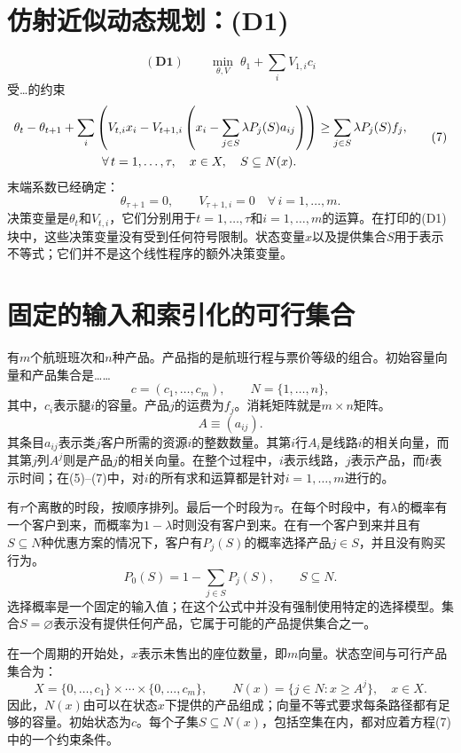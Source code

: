 \documentclass{article}
\begin{document}
\section*{仿射近似动态规划：(D1)}

\begin{equation}
(\mathbf{D1})\qquad
\min_{\theta,V}\;\theta_1+\sum_i V_{1,i}c_i
\tag{6}
\end{equation}
受…的约束
\begin{equation}
\begin{aligned}
&\theta_t-\theta_{t+1}
 +\sum_i\left(V_{t,i}x_i-V_{t+1,i}\left(x_i-\sum_{j\in S}\lambda P_j(S)a_{ij}\right)\right)
 \geq \sum_{j\in S}\lambda P_j(S)f_j,\\
&\hspace{25mm}\forall\,t=1,\ldots,\tau,\quad x\in X,\quad S\subseteq N(x).
\end{aligned}
\tag{7}
\end{equation}
末端系数已经确定：
\[
\theta_{\tau+1}=0,\qquad V_{\tau+1,i}=0\quad\forall\,i=1,\ldots,m.
\]
决策变量是$\theta_t$和$V_{t,i}$，它们分别用于$t=1,\ldots,\tau$和$i=1,\ldots,m$的运算。在打印的(D1)块中，这些决策变量没有受到任何符号限制。状态变量$x$以及提供集合$S$用于表示不等式；它们并不是这个线性程序的额外决策变量。

\section*{固定的输入和索引化的可行集合}

有$m$个航班班次和$n$种产品。产品指的是航班行程与票价等级的组合。初始容量向量和产品集合是……
\[
c=(c_1,\ldots,c_m),\qquad N=\{1,\ldots,n\},
\]
其中，$c_i$表示腿$i$的容量。产品$j$的运费为$f_j$。消耗矩阵就是$m\times n$矩阵。
\[
A\equiv(a_{ij}).
\]
其条目$a_{ij}$表示类$j$客户所需的资源$i$的整数数量。其第$i$行$A_i$是线路$i$的相关向量，而其第$j$列$A^j$则是产品$j$的相关向量。在整个过程中，$i$表示线路，$j$表示产品，而$t$表示时间；在(5)--(7)中，对$i$的所有求和运算都是针对$i=1,\ldots,m$进行的。

有$\tau$个离散的时段，按顺序排列。最后一个时段为$\tau$。在每个时段中，有$\lambda$的概率有一个客户到来，而概率为$1-\lambda$时则没有客户到来。在有一个客户到来并且有$S\subseteq N$种优惠方案的情况下，客户有$P_j(S)$的概率选择产品$j\in S$，并且没有购买行为。
\[
P_0(S)=1-\sum_{j\in S}P_j(S),\qquad S\subseteq N.
\]
选择概率是一个固定的输入值；在这个公式中并没有强制使用特定的选择模型。集合$S=\varnothing$表示没有提供任何产品，它属于可能的产品提供集合之一。

在一个周期的开始处，$x$表示未售出的座位数量，即$m$向量。状态空间与可行产品集合为：
\[
X=\{0,\ldots,c_1\}\times\cdots\times\{0,\ldots,c_m\},
\qquad
N(x)=\{j\in N:x\geq A^j\},\quad x\in X.
\]
因此，$N(x)$由可以在状态$x$下提供的产品组成；向量不等式要求每条路径都有足够的容量。初始状态为$c$。每个子集$S\subseteq N(x)$，包括空集在内，都对应着方程(7)中的一个约束条件。
\end{document}
